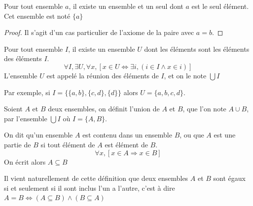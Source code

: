 \begin{proposition}\label{ens: singleton}
	Pour tout ensemble $a$, il existe un ensemble et un seul dont $a$ est le seul élément. Cet ensemble est noté $\{a\}$
\end{proposition}

\begin{proof}
	Il s'agit d'un cas particulier de l'axiome de la paire avec $a=b$.
\end{proof}


\begin{axiome}[de la réunion]\label{ens : axiome : réunion}
	Pour tout ensemble $I$, il existe un ensemble $U$ dont les éléments sont les éléments des éléments $I$.
	\begin{equation*}
		\forall I,\exists U,\forall x, [x\in U \Leftrightarrow \exists i,(i\in I\land x\in i)]
	\end{equation*}
	L'ensemble $U$ est appelé la réunion des éléments de $I$, et on le note $\bigcup I$
\end{axiome}
Par exemple, si $I=\{\{a,b\}, \{c,d\},\{d\}\}$ alors $U= \{a,b,c,d\}$. 
\begin{definition}
	Soient $A$ et $B$ deux ensembles, on définit l'union de $A$ et $B$, que l'on note $A\cup B$, par l'ensemble $\bigcup I$ où $I=\{A,B\}$.
\end{definition}
\begin{definition}
	On dit qu'un ensemble $A$ est contenu dans un ensemble $B$, ou que $A$ est une partie de $B$ si tout élément de $A$ est élément de $B$.
	\begin{equation*}
		\forall x,[x\in A \Rightarrow x\in B]
	\end{equation*}
	On écrit alors $A\subseteq B$
\end{definition}

\begin{remarque}
	Il vient naturellement de cette définition que deux ensembles $A$ et $B$ sont égaux si et seulement si il sont inclus l'un a l'autre, c'est à dire
	$A=B \Leftrightarrow (A\subseteq B) \land ( B\subseteq A)$
\end{remarque}

